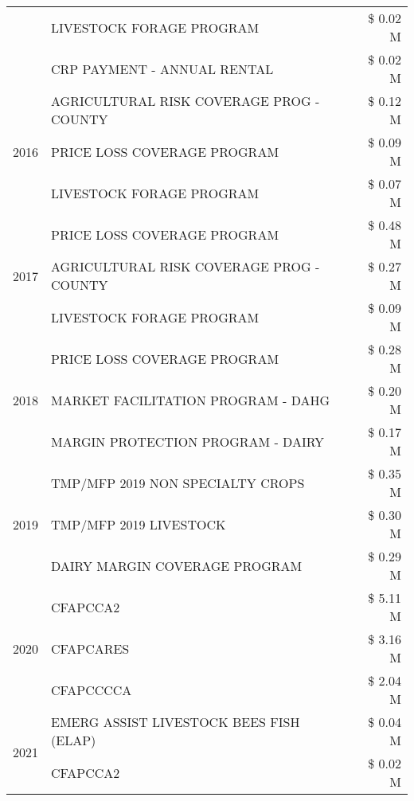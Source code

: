 \begin{tabular}{llr}
 & LIVESTOCK FORAGE PROGRAM & \$ 0.02 M \\
 & CRP PAYMENT - ANNUAL RENTAL & \$ 0.02 M \\
\cline{1-3}
\multirow[t]{3}{*}{2016} & AGRICULTURAL RISK COVERAGE PROG - COUNTY      & \$ 0.12 M \\
 & PRICE LOSS COVERAGE PROGRAM                   & \$ 0.09 M \\
 & LIVESTOCK FORAGE PROGRAM                      & \$ 0.07 M \\
\cline{1-3}
\multirow[t]{3}{*}{2017} & PRICE LOSS COVERAGE PROGRAM & \$ 0.48 M \\
 & AGRICULTURAL RISK COVERAGE PROG - COUNTY & \$ 0.27 M \\
 & LIVESTOCK FORAGE PROGRAM & \$ 0.09 M \\
\cline{1-3}
\multirow[t]{3}{*}{2018} & PRICE LOSS COVERAGE PROGRAM & \$ 0.28 M \\
 & MARKET FACILITATION PROGRAM - DAHG & \$ 0.20 M \\
 & MARGIN PROTECTION PROGRAM - DAIRY & \$ 0.17 M \\
\cline{1-3}
\multirow[t]{3}{*}{2019} & TMP/MFP 2019 NON SPECIALTY CROPS & \$ 0.35 M \\
 & TMP/MFP 2019 LIVESTOCK & \$ 0.30 M \\
 & DAIRY MARGIN COVERAGE PROGRAM & \$ 0.29 M \\
\cline{1-3}
\multirow[t]{3}{*}{2020} & CFAPCCA2 & \$ 5.11 M \\
 & CFAPCARES & \$ 3.16 M \\
 & CFAPCCCCA & \$ 2.04 M \\
\cline{1-3}
\multirow[t]{2}{*}{2021} & EMERG ASSIST LIVESTOCK BEES FISH (ELAP) & \$ 0.04 M \\
 & CFAPCCA2 & \$ 0.02 M \\
\cline{1-3}
\bottomrule
\end{tabular}
